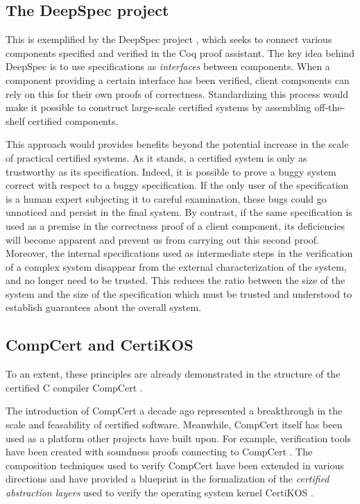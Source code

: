\documentclass[draft,11pt]{report}
\begin{document}

\subsection{The DeepSpec project} %

This is exemplified by the DeepSpec project \citep{deepspec},
which seeks to connect various components
specified and verified in the Coq proof assistant.
The key idea behind DeepSpec
is to use specifications as \emph{interfaces}
between components.
When a component providing a certain interface
has been verified,
client components can rely on this
for their own proofs of correctness.
Standardizing this process would make it possible
to construct large-scale certified systems
by assembling off-the-shelf certified components.

This approach would provides benefits
beyond the potential increase in the scale of
practical certified systems.
As it stands,
a certified system is only
as trustworthy as its specification.
Indeed,
it is possible to prove a buggy system correct
with respect to a buggy specification.
If the only user of the specification
is a human expert subjecting it to careful examination,
these bugs could go unnoticed
and persist in the final system.
By contrast,
if the same specification is used as a premise
in the correctness proof of a client component,
its deficiencies will become apparent
and prevent us from carrying out this second proof.
Moreover,
the internal specifications used
as intermediate steps
in the verification of a complex system
disappear from the external characterization of the system,
and no longer need to be trusted.
This reduces the ratio between the size of the system
and the size of the specification
which must be trusted and understood
to establish guarantees about the overall system.


\subsection{CompCert and CertiKOS} %

To an extent,
these principles are already demonstrated in the structure of the
certified C compiler CompCert \citep{compcert}.

The introduction of CompCert a decade ago
represented a breakthrough
in the scale and feasability of
certified software.
Meanwhile,
CompCert itself
has been used as a platform other projects have built upon.
For example,
verification tools have been created with soundness proofs
connecting to CompCert \citep{vst,verasco}.
The composition techniques used to verify CompCert
have been extended in various directions
\citep{compcompcert,sepcompcert,compcertm}
and have provided a blueprint in the formalization of
the \emph{certified abstraction layers}
used to verify the operating system kernel CertiKOS
\citep{popl15,ccal,osdi16}.
\end{document}
